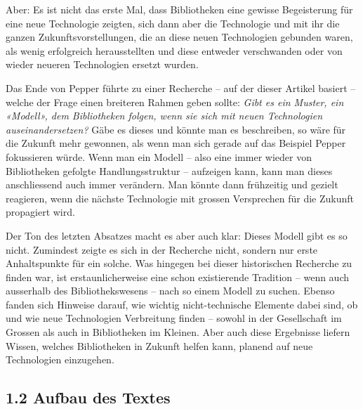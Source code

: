 \documentclass[a4paper,
fontsize=11pt,
oneside,
numbers=noperiodatend,
parskip=half-,
bibliography=totoc,
final
]{scrartcl}
\begin{document}
Aber: Es ist nicht das erste Mal, dass Bibliotheken eine gewisse
Begeisterung für eine neue Technologie zeigten, sich dann aber die
Technologie und mit ihr die ganzen Zukunftsvorstellungen, die an diese
neuen Technologien gebunden waren, als wenig erfolgreich herausstellten
und diese entweder verschwanden oder von wieder neueren Technologien
ersetzt wurden.

Das Ende von Pepper führte zu einer Recherche -- auf der dieser Artikel
basiert -- welche der Frage einen breiteren Rahmen geben sollte:
\emph{Gibt es ein Muster, ein «Modell», dem Bibliotheken folgen, wenn
sie sich mit neuen Technologien auseinandersetzen?} Gäbe es dieses und
könnte man es beschreiben, so wäre für die Zukunft mehr gewonnen, als
wenn man sich gerade auf das Beispiel Pepper fokussieren würde. Wenn man
ein Modell -- also eine immer wieder von Bibliotheken gefolgte
Handlungsstruktur -- aufzeigen kann, kann man dieses anschliessend auch
immer verändern. Man könnte dann frühzeitig und gezielt reagieren, wenn
die nächste Technologie mit grossen Versprechen für die Zukunft
propagiert wird.

Der Ton des letzten Absatzes macht es aber auch klar: Dieses Modell gibt
es so nicht. Zumindest zeigte es sich in der Recherche nicht, sondern
nur erste Anhaltspunkte für ein solche. Was hingegen bei dieser
historischen Recherche zu finden war, ist erstaunlicherweise eine schon
existierende Tradition -- wenn auch ausserhalb des Bibliothekswesens --
nach so einem Modell zu suchen. Ebenso fanden sich Hinweise darauf, wie
wichtig nicht-technische Elemente dabei sind, ob und wie neue
Technologien Verbreitung finden -- sowohl in der Gesellschaft im Grossen
als auch in Bibliotheken im Kleinen. Aber auch diese Ergebnisse liefern
Wissen, welches Bibliotheken in Zukunft helfen kann, planend auf neue
Technologien einzugehen.

\hypertarget{aufbau-des-textes}{%
\subsection{1.2 Aufbau des Textes}\label{aufbau-des-textes}}
\end{document}
